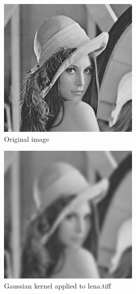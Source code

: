 \documentclass{article}
\begin{document}
\begin{figure}[H]
	\begin{center}
		\includegraphics[width=\textwidth]{./images/lena.png}
		\caption{Original image} 
    \label{lena}
	\end{center}
\end{figure}

\begin{figure}[H]
	\begin{center}
		\includegraphics[width=\textwidth]{./images/imG.png}
		\caption{Gaussian kernel applied to lena.tiff} 
    \label{lenaGauss}
	\end{center}
\end{figure}
\end{document}
